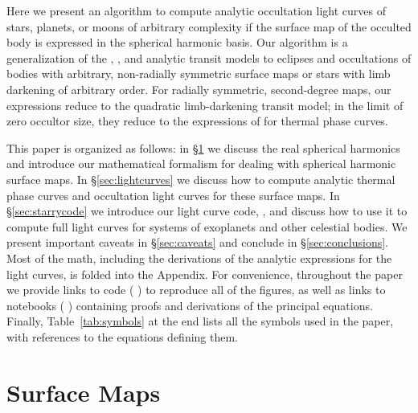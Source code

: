\documentclass[modern]{aastex61}
\begin{document}
Here we present an algorithm to compute analytic occultation light curves of stars,
planets, or moons of arbitrary complexity if the surface map of the occulted body is expressed in the
spherical harmonic basis. Our algorithm is a generalization of the \citet{MandelAgol2002}, \citet{Gimenez2006},
and \citet{Pal2012} analytic transit models to eclipses and occultations of bodies with arbitrary, non-radially
symmetric surface maps or stars with limb darkening of arbitrary order.
For radially symmetric, second-degree maps, our expressions reduce to the \citet{MandelAgol2002}
quadratic limb-darkening transit model; in the limit of zero occultor size, they
reduce to the expressions of \citet{Haggard2018} for thermal phase curves.


This paper is organized as follows: in \S\ref{sec:surfacemaps} we discuss the
real spherical harmonics and introduce our mathematical formalism for
dealing with spherical harmonic surface maps. In \S\ref{sec:lightcurves} we
discuss how to compute analytic thermal phase curves and occultation light curves
for these surface maps. In \S\ref{sec:starrycode} we introduce our
light curve code, \starry, and discuss how to use it to compute full
light curves for systems of exoplanets and other celestial bodies. We
present important caveats in \S\ref{sec:caveats} and conclude in \S\ref{sec:conclusions}.
Most of the math, including the derivations of the analytic expressions for the
light curves, is folded into the Appendix. For convenience, throughout
the paper we provide links
to \Python code (\,\codeicon\,) to reproduce all of the
figures, as well as links to \Jupyter notebooks
(\,\prooficon\,) containing proofs and derivations
of the principal
equations. Finally, Table~\ref{tab:symbols} at the end lists
all the symbols used
in the paper, with references to the equations defining them.

\section{Surface Maps}
\label{sec:surfacemaps}
\end{document}
